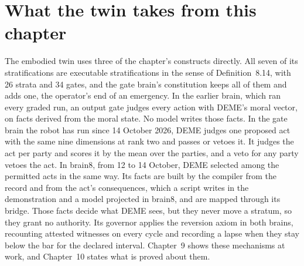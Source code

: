 \section{What the twin takes from this chapter}\label{sec:ge-twin}

The embodied twin uses three of the chapter's constructs directly. All seven of its
stratifications are executable stratifications in the sense of Definition~8.14, with 26 strata
and 34 gates, and the gate brain's constitution keeps all of them and adds one, the operator's end
of an emergency.
In the earlier brain, which ran every graded run, an output gate judges every action with DEME's
moral vector, on facts derived from the moral state. No model writes those facts.
In the gate brain the robot has run since 14 October 2026, DEME judges one proposed act with
the same nine dimensions at rank two and passes or vetoes it. It judges the act per party and
scores it by the mean over the parties, and a veto for any party vetoes the act. In brain8, from 12
to 14 October, DEME selected among the permitted acts in the same way.
Its facts are built by the compiler from the record and from the act's consequences, which a script
writes in the demonstration and a model projected in brain8, and are mapped through its bridge.
Those facts decide what DEME sees, but they never move a stratum, so they grant no authority.
Its governor applies the reversion axiom in both brains, recounting attested witnesses on every
cycle and recording a lapse when they stay below the bar for the declared interval.
Chapter~9 shows these mechanisms at work, and Chapter~10 states what is proved about them.
